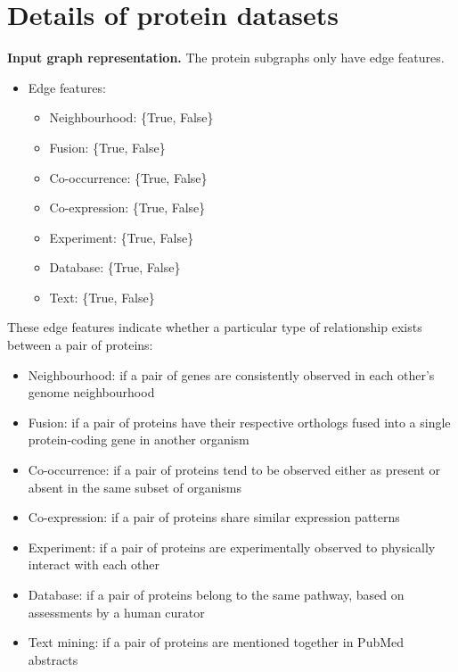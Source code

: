 \documentclass{article} \usepackage{iclr2020_conference,times}
\numberwithin{equation}{section}
\theoremstyle{plain}
\theoremstyle{definition}
\theoremstyle{remark}
\begin{document}
\section{Details of protein datasets} 
\label{app:protein-feat}
{\bf Input graph representation.} The protein subgraphs only have edge features.
\begin{itemize}
\item Edge features:
\begin{itemize}
\item Neighbourhood: \{True, False\}
\item Fusion:  \{True, False\}
\item Co-occurrence:  \{True, False\}
\item Co-expression:  \{True, False\}
\item Experiment:  \{True, False\}
\item Database:  \{True, False\}
\item Text:  \{True, False\}
\end{itemize}
\end{itemize}

These edge features indicate whether a particular type of relationship exists between a pair of proteins:
\begin{itemize}
\item Neighbourhood: if a pair of genes are consistently observed in each other’s genome neighbourhood
\item Fusion: if a pair of proteins have their respective orthologs fused into a single protein-coding gene in another organism
\item Co-occurrence: if a pair of proteins tend to be observed either as present or absent in the same subset of organisms
\item Co-expression: if a pair of proteins share similar expression patterns 
\item Experiment: if a pair of proteins are experimentally observed to physically interact with each other
\item Database: if a pair of proteins belong to the same pathway, based on assessments by a human curator 
\item Text mining: if a pair of proteins are mentioned together in PubMed abstracts
\end{itemize}
\end{document}
